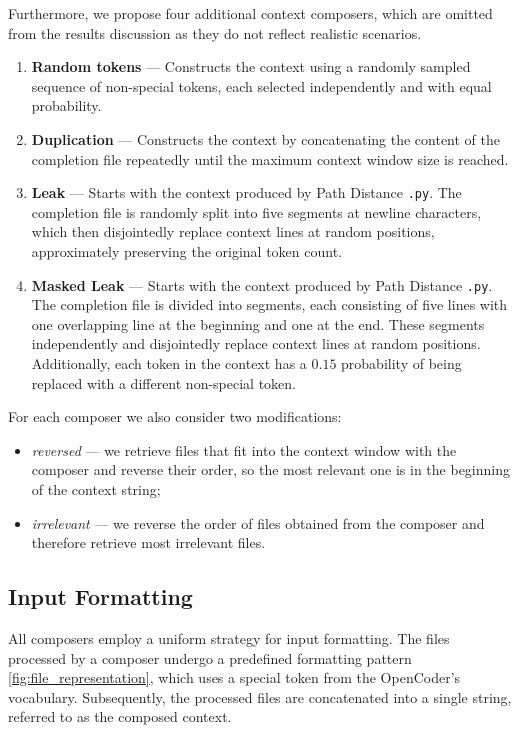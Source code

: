 Furthermore, we propose four additional context composers, which are omitted from the results discussion as they do not reflect realistic scenarios.
\begin{enumerate}    
    \item \textbf{Random tokens} — Constructs the context using a randomly sampled sequence of non-special tokens, each selected independently and with equal probability.
    
    \item \textbf{Duplication} — Constructs the context by concatenating the content of the completion file repeatedly until the maximum context window size is reached.
    
    \item \textbf{Leak} — Starts with the context produced by Path Distance \texttt{.py}. The completion file is randomly split into five segments at newline characters, which then disjointedly replace context lines at random positions, approximately preserving the original token count.

    \item \textbf{Masked Leak} — Starts with the context produced by Path Distance \texttt{.py}. The completion file is divided into segments, each consisting of five lines with one overlapping line at the beginning and one at the end. These segments independently and disjointedly replace context lines at random positions. Additionally, each token in the context has a $0.15$ probability of being replaced with a different non-special token.
\end{enumerate}

For each composer we also consider two modifications:
\begin{itemize}
    \item \textit{reversed} --- we retrieve files that fit into the context window with the composer and reverse their order, so the most relevant one is in the beginning of the context string;
    \item \textit{irrelevant} --- we reverse the order of files obtained from the composer and therefore retrieve most irrelevant files.
\end{itemize}

\subsection{Input Formatting}

All composers employ a uniform strategy for input formatting. The files processed by a composer undergo a predefined formatting pattern \ref{fig:file_representation}, which uses a special token from the OpenCoder's vocabulary. Subsequently, the processed files are concatenated into a single string, referred to as the composed context.

